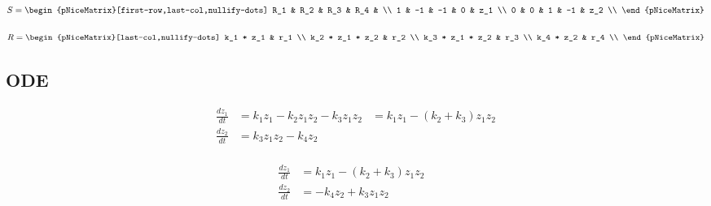 \documentclass[]{scrartcl}
\begin{document}
\begin{center}
\noindent \begin{minipage}{.4\linewidth}
$
S =
\begin{pNiceMatrix}[first-row,last-col,nullify-dots]
	R_1	&	R_2 &	R_3 &	R_4 &		\\
	  1 &	 -1 &	 -1 &	  0 &	z_1 \\
	  0 &	  0 &	  1 &	 -1 &	z_2 \\
\end{pNiceMatrix}
$
\end{minipage}
\noindent \begin{minipage}{.4\linewidth}
$
R =
\begin{pNiceMatrix}[last-col,nullify-dots]
	k_1 * z_1		& r_1 \\
	k_2 * z_1 * z_2 & r_2 \\
	k_3 * z_1 * z_2 & r_3 \\
	k_4 * z_2		& r_4 \\
\end{pNiceMatrix}
$
\end{minipage}
\end{center}



\subsection*{ODE}

\begin{center}
\noindent \begin{minipage}{.5\linewidth}
\begin{align*}
	\frac{dz_1}{dt} & = k_1 z_1 - k_2 z_1 z_2 - k_3 z_1 z_2 & =  k_1 z_1 - (k_2 + k_3) z_1 z_2 \\
	\frac{dz_2}{dt} & = k_3 z_1 z_2 - k_4 z_2 & \\
\end{align*}
\end{minipage}
\end{center}


\begin{center}
\noindent \begin{minipage}{.5\linewidth}
\begin{align*}
	\frac{dz_1}{dt} & = k_1 z_1 - (k_2 + k_3) z_1 z_2 \\
	\frac{dz_2}{dt} & = - k_4 z_2 + k_3 z_1 z_2 & \\
\end{align*}
\end{minipage}
\end{center}
\end{document}
